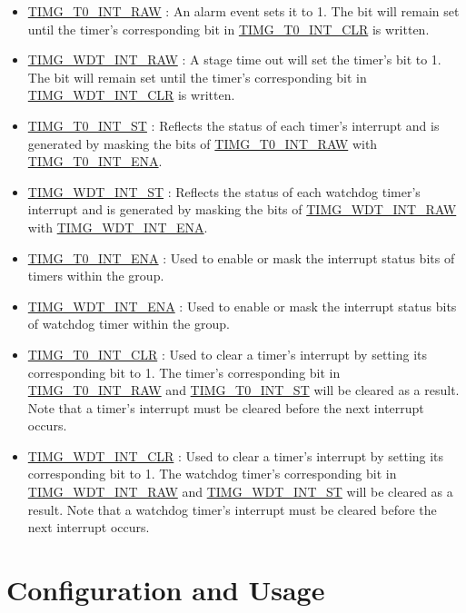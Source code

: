 \documentclass[main\_\_EN.tex]{subfiles}
\begin{document}
\begin{itemize}

\item \hyperref[fielddesc:TIMGT0INTRAW]{TIMG\_T0\_INT\_RAW} :
An alarm event sets it to 1. The bit will remain set until the timer's corresponding bit in \hyperref[fielddesc:TIMGT0INTCLR]{TIMG\_T0\_INT\_CLR} is written.
\item \hyperref[fielddesc:TIMGWDTINTRAW]{TIMG\_WDT\_INT\_RAW} : A stage time out will set the timer's bit to 1. The bit will remain set until the timer's corresponding bit in \hyperref[fielddesc:TIMGWDTINTCLR]{TIMG\_WDT\_INT\_CLR} is written.
\item \hyperref[fielddesc:TIMGT0INTST]{TIMG\_T0\_INT\_ST} : Reflects the status of each timer's interrupt and is generated by masking the bits of \hyperref[fielddesc:TIMGT0INTRAW]{TIMG\_T0\_INT\_RAW} with \hyperref[fielddesc:TIMGT0INTENA]{TIMG\_T0\_INT\_ENA}. 
\item \hyperref[fielddesc:TIMGWDTINTST]{TIMG\_WDT\_INT\_ST} : Reflects the status of each watchdog timer's interrupt and is generated by masking the bits of \hyperref[fielddesc:TIMGWDTINTRAW]{TIMG\_WDT\_INT\_RAW} with \hyperref[fielddesc:TIMGWDTINTENA]{TIMG\_WDT\_INT\_ENA}. 
\item \hyperref[fielddesc:TIMGT0INTENA]{TIMG\_T0\_INT\_ENA} : Used to enable or mask the interrupt status bits of timers within the group.
\item \hyperref[fielddesc:TIMGWDTINTENA]{TIMG\_WDT\_INT\_ENA} : Used to enable or mask the interrupt status bits of watchdog timer within the group.
\item \hyperref[fielddesc:TIMGT0INTCLR]{TIMG\_T0\_INT\_CLR} : Used to clear a timer's interrupt by setting its corresponding bit to 1. The timer's corresponding bit in \hyperref[fielddesc:TIMGT0INTRAW]{TIMG\_T0\_INT\_RAW} and \hyperref[fielddesc:TIMGT0INTST]{TIMG\_T0\_INT\_ST} will be cleared as a result. Note that a timer's interrupt must be cleared before the next interrupt occurs.
\item \hyperref[fielddesc:TIMGWDTINTCLR]{TIMG\_WDT\_INT\_CLR} : Used to clear a timer's interrupt by setting its corresponding bit to 1. The watchdog timer's corresponding bit in \hyperref[fielddesc:TIMGWDTINTRAW]{TIMG\_WDT\_INT\_RAW} and \hyperref[fielddesc:TIMGWDTINTST]{TIMG\_WDT\_INT\_ST} will be cleared as a result. Note that a watchdog timer's interrupt must be cleared before the next interrupt occurs.
\end{itemize}

\section{Configuration and Usage}
\end{document}
